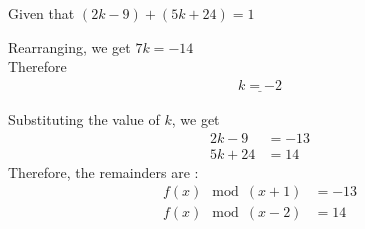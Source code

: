 \documentclass[11pt, oneside, twocolumn, reqno]{amsart}   	%
\begin{document}
Given that $(2k - 9) + (5k + 24) = 1$
		
Rearranging, we get $7k = -14$ \\
		
Therefore \begin{align} \underline{k = -2} \end{align}
		
Substituting the value of $k$, we get
	\begin{align}
		2k - 9 &= -13 \\
		5k + 24 &= 14
\end{align}
Therefore, the remainders are :
\begin{align}
	f(x) \mod (x + 1) &= -13 \\
	f(x) \mod (x - 2) &= 14
\end{align}
\end{document}
